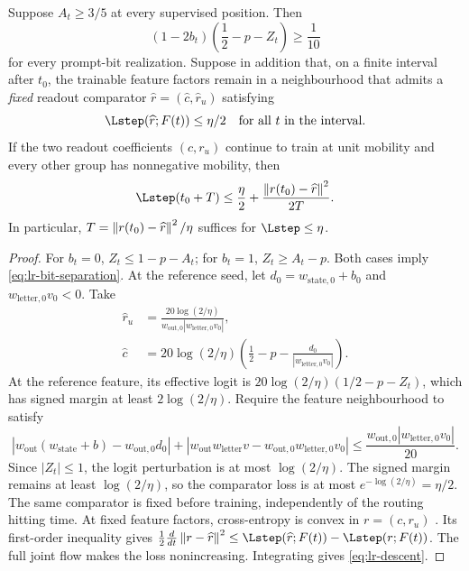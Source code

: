 \begin{lemma}
\label{lem:lr-readout-convergence}
Suppose $A_t\ge3/5$ at every supervised position.  Then
\begin{equation}\label{eq:lr-bit-separation}
 (1-2b_t)\left(\frac12-p-Z_t\right)\ge\frac1{10}
\end{equation}
for every prompt-bit realization.  Suppose in addition that, on a
finite interval after $t_0$, the trainable feature factors remain in a
neighbourhood that admits a \emph{fixed} readout comparator
$\widehat r=(\widehat c,\widehat r_u)$ satisfying
\begin{equation}\label{eq:lr-comparator}
 \Lstep(\widehat r;F(t))\le \eta/2
 \quad\text{for all }t\text{ in the interval}.
\end{equation}
If the two readout coefficients $(c,r_u)$ continue to train at unit
mobility and every other group has nonnegative mobility, then
\begin{equation}\label{eq:lr-descent}
 \Lstep(t_0+T)\le\frac{\eta}{2}+
 \frac{\LRnorm{r(t_0)-\widehat r}^2}{2T}.
\end{equation}
In particular, $T=\left\lVert r(t_0)-\widehat r\right\rVert^2/\eta$ suffices for
$\Lstep\le \eta$.
\end{lemma}
\begin{proof}
For $b_t=0$, $Z_t\le1-p-A_t$; for $b_t=1$,
$Z_t\ge A_t-p$.  Both cases imply
\eqref{eq:lr-bit-separation}.
At the reference seed, let $d_0=w_{\mathrm{state},0}+b_0$ and $w_{\mathrm{letter},0}v_0<0$. Take
\[
 \begin{aligned}
 \widehat r_u&=\frac{20\log(2/\eta)}{w_{\mathrm{out},0}|w_{\mathrm{letter},0}v_0|},\\
 \widehat c&=20\log(2/\eta)\left(\frac12-p-\frac{d_0}{|w_{\mathrm{letter},0}v_0|}\right).
 \end{aligned}
\] 
At the reference feature, its effective logit is
$20\log(2/\eta)(1/2-p-Z_t)$, which has signed margin at least $2\log(2/\eta)$.
Require the feature neighbourhood to satisfy
\begin{equation}\label{eq:lr-comparator-stability}
 |w_{\mathrm{out}}(w_{\mathrm{state}}+b)-w_{\mathrm{out},0}d_0|+|w_{\mathrm{out}} {w_{\mathrm{letter}} v}-w_{\mathrm{out},0}{w_{\mathrm{letter},0}v_0}|
 \le\frac{w_{\mathrm{out},0}|{w_{\mathrm{letter},0}v_0}|}{20}.
\end{equation}
Since $|Z_t|\le1$, the logit perturbation is at most $\log(2/\eta)$.
The signed margin remains at least $\log(2/\eta)$, so the comparator loss is
at most $e^{-\log(2/\eta)}=\eta/2$. The same comparator is fixed before training,
independently of the routing hitting time.
At fixed feature factors, cross-entropy is convex in $r=(c,r_u)$ \citep[Section~3.1.5]{boyd2004convex}. Its first-order inequality \citep[Section~3.1.3]{boyd2004convex} gives
$\frac12\frac{d}{dt}\LRnorm{r-\widehat r}^2
\le\Lstep(\widehat r;F(t))-\Lstep(r;F(t))$.
The full joint flow makes the loss nonincreasing.  Integrating gives
\eqref{eq:lr-descent}.
\end{proof}

